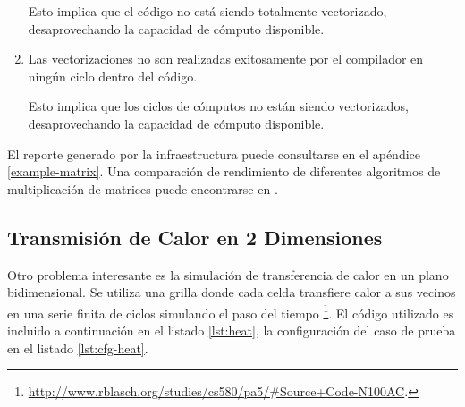 \documentclass[a4paper]{report}
\begin{document}
\begin{enumerate}
\smallskip

Esto implica que el código no está siendo totalmente vectorizado, desaprovechando la capacidad de cómputo disponible.

\item Las vectorizaciones no son realizadas exitosamente por el compilador en ningún ciclo dentro del código.

\smallskip

Esto implica que los ciclos de cómputos no están siendo vectorizados, desaprovechando la capacidad de cómputo disponible.

\end{enumerate}

El reporte generado por la infraestructura puede consultarse en el apéndice \ref{example-matrix}.
Una comparación de rendimiento de diferentes algoritmos de multiplicación de matrices puede encontrarse en \cite{mm-tool}.

\subsection{Transmisión de Calor en 2 Dimensiones}

Otro problema interesante es la simulación de transferencia de calor en un plano bidimensional.
Se utiliza una grilla donde cada celda transfiere calor a sus vecinos en una serie finita de ciclos simulando el paso del tiempo \footnote{\href{http://www.rblasch.org/studies/cs580/pa5/\#Source+Code-N100AC}{http://www.rblasch.org/studies/cs580/pa5/\#Source+Code-N100AC}.}. El código utilizado es incluido a continuación en el listado \ref{lst:heat}, la configuración del caso de prueba en el listado \ref{lst:cfg-heat}.

\bigskip
\end{document}
